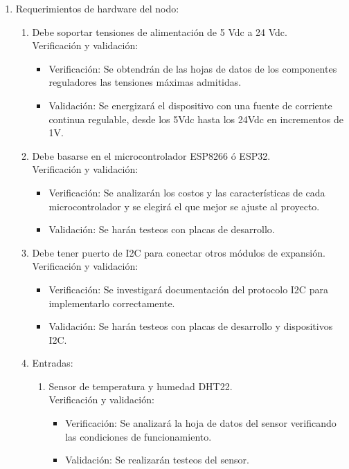\documentclass[11pt]{charter}
\begin{document}
\begin{enumerate}
\item Requerimientos de hardware del nodo:
	\begin{enumerate}
	\item Debe soportar tensiones de alimentación de 5 Vdc a 24 Vdc.
		\\Verificación y validación:
		\begin{itemize}
		\item Verificación: Se obtendrán de las hojas de datos de los componentes reguladores las tensiones máximas admitidas. 
		\item Validación: Se energizará el dispositivo con una fuente de corriente continua regulable, desde los 5Vdc hasta los 24Vdc en incrementos de 1V. 
		\end{itemize}
	\item Debe basarse en el microcontrolador ESP8266 ó ESP32.
	\\Verificación y validación:
		\begin{itemize}
		\item Verificación: Se analizarán los costos y las características de cada microcontrolador y se elegirá el que mejor se ajuste al proyecto.
		\item Validación: Se harán testeos con placas de desarrollo.
		\end{itemize}
	\item Debe tener puerto de I2C para conectar otros módulos de expansión.
		\\Verificación y validación:
		\begin{itemize}
		\item Verificación: Se investigará documentación del protocolo I2C para implementarlo correctamente.
		\item Validación: Se harán testeos con placas de desarrollo y dispositivos I2C.
		\end{itemize}
	\item Entradas:
		\begin{enumerate}
		\item Sensor de temperatura y humedad DHT22.
			\\Verificación y validación:
			\begin{itemize}
			\item Verificación: Se analizará la hoja de datos del sensor verificando las condiciones de funcionamiento.
			\item Validación: Se realizarán testeos del sensor.
			\end{itemize}

\end{enumerate}
\end{enumerate}
\end{enumerate}
\end{document}
